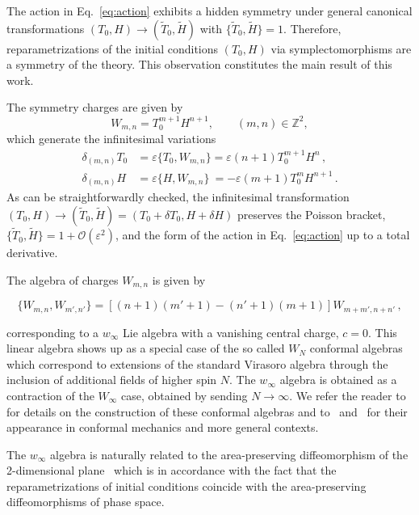 \documentclass[onecolumn,notitlepage,superscriptaddress, nofootinbib,nobibnotes, aps,prd,10pt]{revtex4-1}%
\begin{document}
The action in Eq.~\eqref{eq:action} exhibits a hidden symmetry under general canonical transformations $(T_0,H)\rightarrow (\tilde{T}_0,\tilde{H})$ with $\{\tilde{T}_0,\tilde{H}\} = 1$. Therefore, reparametrizations of the initial conditions $(T_0,H)$ via symplectomorphisms are a symmetry of the theory. This observation constitutes the main result of this work. 

The symmetry charges are given by
%
\begin{equation}
W_{m,n} = T_0^{m+1}H^{n+1},\qquad (m,n)\in\mathbb{Z}^2,
\end{equation}
%
which generate the infinitesimal variations
%
\begin{subequations}
\begin{align}
\delta_{(m,n)} T_0 &= \varepsilon\{T_0,W_{m,n}\} = \varepsilon(n+1)T_0^{m+1}H^n\, ,\\[7pt]
\delta_{(m,n)} H &= \varepsilon\{H,W_{m,n}\} \:= -\varepsilon(m+1)T_0^mH^{n+1}\, .
\end{align}
\end{subequations}
%
As can be straightforwardly checked, the infinitesimal transformation $(T_0,H)\rightarrow(\tilde{T}_0,\tilde{H}) = (T_0+\delta T_0, H+\delta H)$ preserves the Poisson bracket, $\{\tilde{T}_0,\tilde{H}\} = 1+\mathcal{O}(\varepsilon^2)$, and the form of the action in Eq.~\eqref{eq:action} up to a total derivative. 


The algebra of charges $W_{m,n}$ is given by
%
\begin{widetext}
\begin{equation}\label{eq:w algebra}
 \{ W_{m,n}, W_{m',n'} \}  = \left[ (n+1)(m'+1) - (n'+1)(m+1)\right] W_{m+m', n+n'} \, ,
\end{equation}
\end{widetext}
%
corresponding to a $w_{\infty}$ Lie algebra with a vanishing central charge, $c=0$. This linear algebra shows up as a special case of the so called $W_{N}$ conformal algebras which correspond to extensions of the standard Virasoro algebra through the inclusion of additional fields of higher spin $N$. The $w_{\infty}$ algebra is obtained as a contraction of the $W_{\infty}$ case, obtained by sending $N \rightarrow \infty$. We refer the reader to~\cite{Pope:1991ig,Bakas:1989mz,Bakas:1990sh} for details on the construction of these conformal algebras and to~\cite{Kumar:1999fx,Cacciatori:1999rp} and~\cite{Mignemi:2000cv} for their appearance in conformal mechanics and more general contexts. 

The $w_{\infty}$ algebra is naturally related to the area-preserving diffeomorphism of the 2-dimensional plane~\cite{Bakas:1989mz} which is in accordance with the fact that the reparametrizations of initial conditions coincide with the area-preserving diffeomorphisms of phase space.
\end{document}
